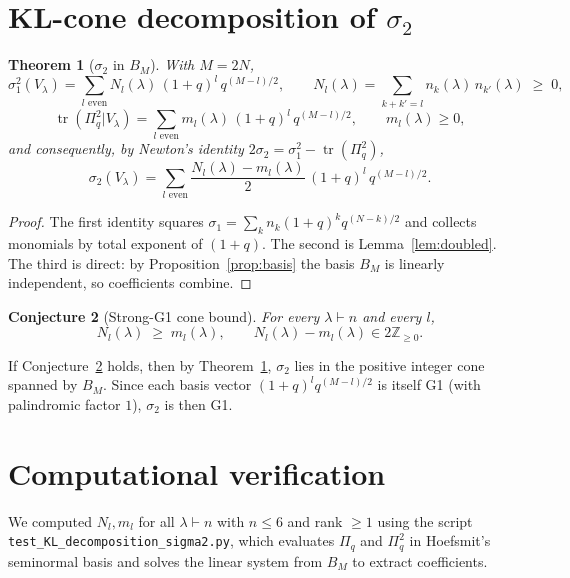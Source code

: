 \documentclass{article}
\newtheorem{theorem}{Theorem}
\newtheorem{conjecture}[theorem]{Conjecture}
\theoremstyle{definition}
\begin{document}
\section{KL-cone decomposition of $\sigma_2$}

\begin{theorem}[$\sigma_2$ in $B_M$]\label{thm:sigma2-decomp}
With $M = 2N$,
\[
  \sigma_1^2(V_\lambda) = \sum_{l \text{ even}} N_l(\lambda)\, (1+q)^l\, q^{(M-l)/2}, \qquad
  N_l(\lambda) = \sum_{k+k'=l} n_k(\lambda)\, n_{k'}(\lambda) \;\geq\; 0,
\]
\[
  \operatorname{tr}(\Pi_q^2 | V_\lambda) = \sum_{l \text{ even}} m_l(\lambda)\, (1+q)^l\, q^{(M-l)/2}, \qquad m_l(\lambda) \geq 0,
\]
and consequently, by Newton's identity $2\sigma_2 = \sigma_1^2 - \operatorname{tr}(\Pi_q^2)$,
\[
  \sigma_2(V_\lambda) = \sum_{l \text{ even}} \frac{N_l(\lambda) - m_l(\lambda)}{2}\,(1+q)^l\, q^{(M-l)/2}.
\]
\end{theorem}

\begin{proof}
The first identity squares $\sigma_1 = \sum_k n_k (1+q)^k q^{(N-k)/2}$ and
collects monomials by total exponent of $(1+q)$. The second is Lemma~\ref{lem:doubled}.
The third is direct: by Proposition~\ref{prop:basis} the basis $B_M$ is linearly
independent, so coefficients combine.
\end{proof}

\begin{conjecture}[Strong-G1 cone bound]\label{conj:strong}
For every $\lambda \vdash n$ and every $l$,
\[
  N_l(\lambda) \;\geq\; m_l(\lambda),\qquad N_l(\lambda) - m_l(\lambda) \in 2\mathbb{Z}_{\geq 0}.
\]
\end{conjecture}

If Conjecture~\ref{conj:strong} holds, then by Theorem~\ref{thm:sigma2-decomp},
$\sigma_2$ lies in the positive integer cone spanned by $B_M$. Since each basis
vector $(1+q)^l q^{(M-l)/2}$ is itself G1 (with palindromic factor $1$),
$\sigma_2$ is then G1.

\section{Computational verification}

We computed $N_l, m_l$ for all $\lambda \vdash n$ with $n \leq 6$ and rank $\geq 1$
using the script \texttt{test\_KL\_decomposition\_sigma2.py}, which evaluates
$\Pi_q$ and $\Pi_q^2$ in Hoefsmit's seminormal basis and solves the linear
system from $B_M$ to extract coefficients.
\end{document}
